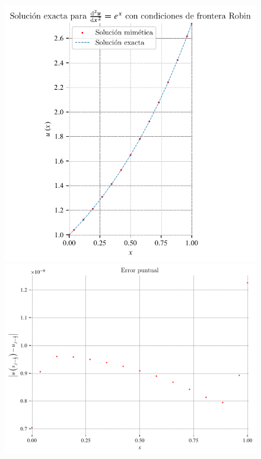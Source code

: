 \begin{problem}
\begin{figure}[ht!]
    \centering
    \includegraphics[width=.39\paperwidth]{elliptic1D.pdf}
    \includegraphics[width=.39\paperwidth]{elliptic1Derror.pdf}

\end{figure}
\end{problem}
